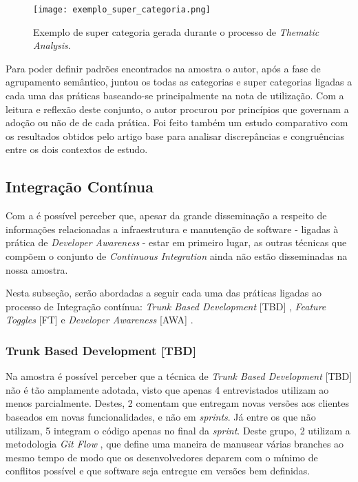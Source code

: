 \begin{figure}[ht]
\begin{center}
\texttt{[image: exemplo\_super\_categoria.png]}
\end{center}
\caption[Exemplo de super categoria]{
    Exemplo de super categoria gerada durante o processo de \emph{Thematic Analysis}.
}\label{exemplo_super_categoria}
\end{figure}

Para poder definir padrões encontrados na amostra o autor, após a fase de agrupamento semântico, juntou os todas as categorias e super categorias ligadas a cada uma das práticas baseando-se principalmente na nota de utilização. Com a leitura e reflexão deste conjunto, o autor procurou por princípios que governam a adoção ou não de de cada prática. Foi feito também um estudo comparativo com os resultados obtidos pelo artigo base para analisar discrepâncias e congruências entre os dois contextos de estudo.

\subsection{Integração Contínua}

Com a  é possível perceber que, apesar da grande disseminação a respeito de informações relacionadas a infraestrutura e manutenção de software - ligadas à prática de \emph{Developer Awareness} \cite{awa} - estar em primeiro lugar, as outras técnicas que compõem o conjunto de \emph{Continuous Integration} ainda não estão disseminadas na nossa amostra.

Nesta subseção, serão abordadas a seguir cada uma das práticas ligadas ao processo de Integração contínua: \emph{Trunk Based Development} [TBD] \cite{devAndDeploymentFB}, \emph{Feature Toggles} [FT] \cite{featureToggles} e \emph{Developer Awareness} [AWA] .


\subsubsection{Trunk Based Development [TBD]}
Na amostra é possível perceber que a técnica de \emph{Trunk Based Development} [TBD] não é tão amplamente adotada, visto que apenas 4 entrevistados utilizam ao menos parcialmente. Destes, 2 comentam que entregam novas versões aos clientes baseados em novas funcionalidades, e não em \emph{sprints}. Já entre os que não utilizam, 5 integram o código apenas no final da \emph{sprint}. Deste grupo, 2 utilizam a metodologia \emph{Git Flow} \cite{gitFlow}, que define uma maneira de manusear várias branches ao mesmo tempo de modo que os desenvolvedores deparem com o mínimo de conflitos possível e que software seja entregue em versões bem definidas.

